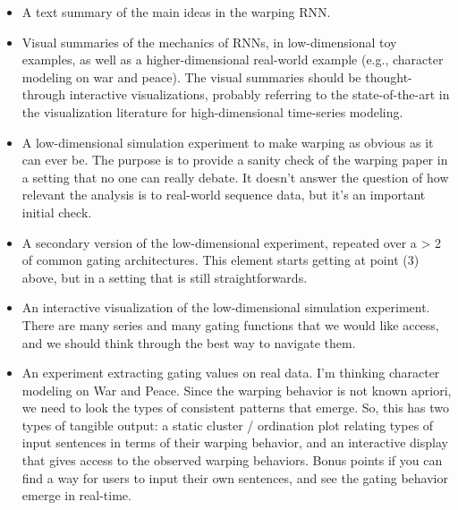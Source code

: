 \documentclass{article}
\begin{document}
\begin{itemize}
  \item A text summary of the main ideas in the warping RNN.
  \item Visual summaries of the mechanics of RNNs, in low-dimensional toy
    examples, as well as a higher-dimensional real-world example (e.g.,
    character modeling on war and peace). The visual summaries should be
    thought-through interactive visualizations, probably referring to the
    state-of-the-art in the visualization literature for high-dimensional
    time-series modeling.
  \item A low-dimensional simulation experiment to make warping as obvious as it
    can ever be. The purpose is to provide a sanity check of the warping paper
    in a setting that no one can really debate. It doesn't answer the question
    of how relevant the analysis is to real-world sequence data, but it's an
    important initial check.
  \item A secondary version of the low-dimensional experiment, repeated over a >
    2 of common gating architectures. This element starts getting at point (3)
    above, but in a setting that is still straightforwards.
  \item An interactive visualization of the low-dimensional simulation
    experiment. There are many series and many gating functions that we would
    like access, and we should think through the best way to navigate them.
  \item An experiment extracting gating values on real data. I'm thinking
    character modeling on War and Peace. Since the warping behavior is not known
    apriori, we need to look the types of consistent patterns that emerge. So,
    this has two types of tangible output: a static cluster / ordination plot
    relating types of input sentences in terms of their warping behavior, and an
    interactive display that gives access to the observed warping behaviors.
    Bonus points if you can find a way for users to input their own sentences,
    and see the gating behavior emerge in real-time.
\end{itemize}
\end{document}
